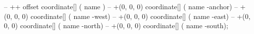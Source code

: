  -- ++{{ offset }} coordinate[] ({{ name }}) 
-- +(0, 0, 0) coordinate[] ({{ name }}-anchor)
-- +(0, 0, 0) coordinate[] ({{ name }}-west)
-- +(0, 0, 0) coordinate[] ({{ name }}-east)
-- +(0, 0, 0) coordinate[] ({{ name }}-north)
-- +(0, 0, 0) coordinate[] ({{ name }}-south);
